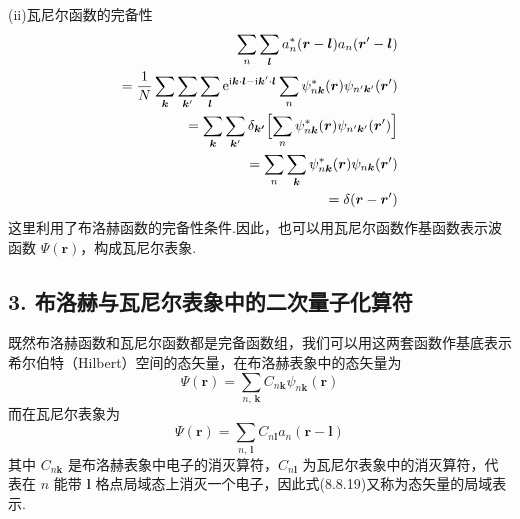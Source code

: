 (ii)瓦尼尔函数的完备性
\begin{equation}
\begin{aligned}
  \sum_{n}\sum_{\boldsymbol{l}}a_{n}^{*}(\boldsymbol{r}-\boldsymbol{l})a_{n}(\boldsymbol{r}'-\boldsymbol{l})&\\
  =\frac{1}{N}\sum_{\boldsymbol{k}}\sum_{\boldsymbol{k}'}\sum_{\boldsymbol{l}}
  \mathrm{e}^{\mathrm{i}\boldsymbol{k}\cdot\boldsymbol{l}-\mathrm{i}\boldsymbol{k}'\cdot\boldsymbol{l}}
  \sum_{n}\psi_{n\boldsymbol{k}}^{*}(\boldsymbol{r})\psi_{n'\boldsymbol{k}'}(\boldsymbol{r}')&\\
  =\sum_{\boldsymbol{k}}\sum_{\boldsymbol{k}'}\delta_{\boldsymbol{k}\boldsymbol{'}}
  \Bigl[\sum_{n}\psi_{n\boldsymbol{k}}^{*}(\boldsymbol{r})\psi_{n'\boldsymbol{k}'}(\boldsymbol{r}')\Bigr]&\\
  =\sum_{n}\sum_{\boldsymbol{k}}\psi_{n\boldsymbol{k}}^{*}(\boldsymbol{r})\psi_{n\boldsymbol{k}}(\boldsymbol{r}')&\\
  =\delta(\boldsymbol{r}-\boldsymbol{r}')&
\end{aligned}
\end{equation}
这里利用了布洛赫函数的完备性条件.因此，也可以用瓦尼尔函数作基函数表示波函数 $\Psi(\boldsymbol{r})$，构成瓦尼尔表象.

\subsection*{3. 布洛赫与瓦尼尔表象中的二次量子化算符}

既然布洛赫函数和瓦尼尔函数都是完备函数组，我们可以用这两套函数作基底表示希尔伯特（Hilbert）空间的态矢量，在布洛赫表象中的态矢量为
\begin{equation}
  \Psi(\boldsymbol{r})=\sum_{n,\,\boldsymbol{k}}C_{n\boldsymbol{k}}\psi_{n\boldsymbol{k}}(\boldsymbol{r})
\end{equation}
而在瓦尼尔表象为
\begin{equation}
  \Psi(\boldsymbol{r})=\sum_{n,\,\boldsymbol{l}}C_{n\boldsymbol{l}}a_{n}(\boldsymbol{r}-\boldsymbol{l})
\end{equation}
其中 $C_{n\boldsymbol{k}}$ 是布洛赫表象中电子的消灭算符，$C_{n\boldsymbol{l}}$ 为瓦尼尔表象中的消灭算符，代表在 $n$ 能带 $\boldsymbol{l}$ 格点局域态上消灭一个电子，因此式(8.8.19)又称为态矢量的局域表示.

